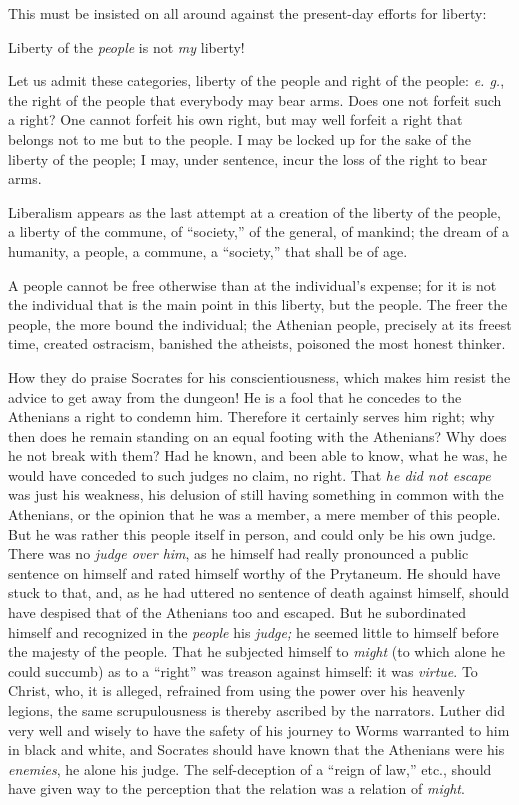 \documentclass[12pt,a4paper]{book}
\begin{document}
This must be insisted on all around against the present-day efforts for 
liberty:

Liberty of the \textit{people} is not \textit{my} liberty!

Let us admit these categories, liberty of the people and right of the people: 
\textit{e. g.}, the right of the people that everybody may bear arms. Does one 
not forfeit such a right? One cannot forfeit his own right, but may well 
forfeit a right that belongs not to me but to the people. I may be locked up 
for the sake of the liberty of the people; I may, under sentence, incur the 
loss of the right to bear arms.

Liberalism appears as the last attempt at a creation of the liberty of the 
people, a liberty of the commune, of ``society,'' of the general, of 
mankind; the dream of a humanity, a people, a commune, a ``society,'' that 
shall be of age.

A people cannot be free otherwise than at the individual's expense; for it is 
not the individual that is the main point in this liberty, but the people. The 
freer the people, the more bound the individual; the Athenian people, 
precisely at its freest time, created ostracism, banished the atheists, 
poisoned the most honest thinker.

How they do praise Socrates for his conscientiousness, which makes him resist 
the advice to get away from the dungeon! He is a fool that he concedes to the 
Athenians a right to condemn him. Therefore it certainly serves him right; why 
then does he remain standing on an equal footing with the Athenians? Why does 
he not break with them? Had he known, and been able to know, what he was, he 
would have conceded to such judges no claim, no right. That \textit{he did not 
escape} was just his weakness, his delusion of still having something in 
common with the Athenians, or the opinion that he was a member, a mere member 
of this people. But he was rather this people itself in person, and could only 
be his own judge. There was no \textit{judge over him}, as he himself had 
really pronounced a public sentence on himself and rated himself worthy of the 
Prytaneum. He should have stuck to that, and, as he had uttered no sentence of 
death against himself, should have despised that of the Athenians too and 
escaped. But he subordinated himself and recognized in the \textit{people} his 
\textit{judge;} he seemed little to himself before the majesty of the people. 
That he subjected himself to \textit{might} (to which alone he could succumb) 
as to a ``right'' was treason against himself: it was \textit{virtue}. To 
Christ, who, it is alleged, refrained from using the power over his heavenly 
legions, the same scrupulousness is thereby ascribed by the narrators. Luther 
did very well and wisely to have the safety of his journey to Worms warranted 
to him in black and white, and Socrates should have known that the Athenians 
were his \textit{enemies}, he alone his judge. The self-deception of a 
``reign of law,'' etc., should have given way to the perception that the 
relation was a relation of \textit{might}.
\end{document}
